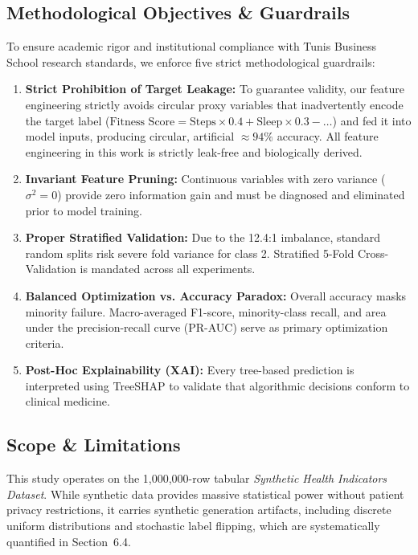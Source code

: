 \documentclass[11pt,a4paper]{article}
\begin{document}
\subsection{Methodological Objectives \& Guardrails}
To ensure academic rigor and institutional compliance with Tunis Business School research standards, we enforce five strict methodological guardrails:
\begin{enumerate}[leftmargin=*,itemsep=1pt]
    \item \textbf{Strict Prohibition of Target Leakage:} To guarantee validity, our feature engineering strictly avoids circular proxy variables that inadvertently encode the target label ($\text{Fitness Score} = \text{Steps} \times 0.4 + \text{Sleep} \times 0.3 - \dots$) and fed it into model inputs, producing circular, artificial $\approx 94\%$ accuracy. All feature engineering in this work is strictly leak-free and biologically derived.
    \item \textbf{Invariant Feature Pruning:} Continuous variables with zero variance ($\sigma^2 = 0$) provide zero information gain and must be diagnosed and eliminated prior to model training.
    \item \textbf{Proper Stratified Validation:} Due to the 12.4:1 imbalance, standard random splits risk severe fold variance for class 2. Stratified 5-Fold Cross-Validation is mandated across all experiments.
    \item \textbf{Balanced Optimization vs. Accuracy Paradox:} Overall accuracy masks minority failure. Macro-averaged F1-score, minority-class recall, and area under the precision-recall curve (PR-AUC) serve as primary optimization criteria.
    \item \textbf{Post-Hoc Explainability (XAI):} Every tree-based prediction is interpreted using TreeSHAP to validate that algorithmic decisions conform to clinical medicine.
\end{enumerate}

\subsection{Scope \& Limitations}
This study operates on the 1,000,000-row tabular \emph{Synthetic Health Indicators Dataset}. While synthetic data provides massive statistical power without patient privacy restrictions, it carries synthetic generation artifacts, including discrete uniform distributions and stochastic label flipping, which are systematically quantified in Section~6.4.
\end{document}
